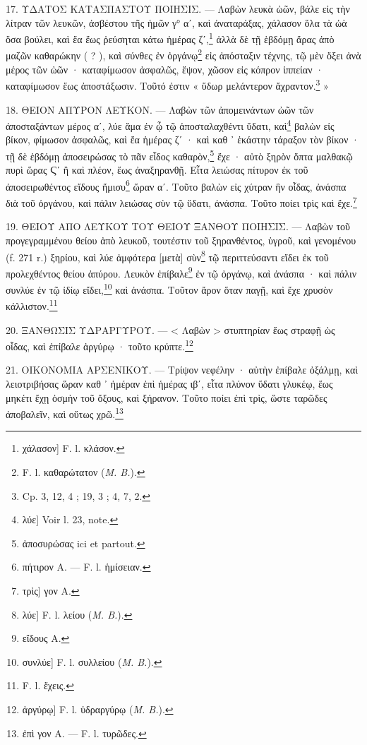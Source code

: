 \documentclass[a4paper, 11pt, oneside, polutonikogreek, french]{article}
\begin{document}
17. ΥΔΑΤΟΣ ΚΑΤΑΣΠΑΣΤΟΥ ΠΟΙΗΣΙΣ. --- Λαβὼν λευκὰ ὠῶν, βάλε εἰς τὴν λίτραν τῶν λευκῶν, ἀσβέστου τῆς ἡμῶν γ° αʹ, καὶ ἀναταράξας, χάλασον ὅλα τὰ ὠὰ ὅσα βούλει, καὶ ἔα ἕως ῥεύσηται κάτω ἡμέρας ζʹ,\footnote{χάλασον] F. l. κλάσον.} ἀλλὰ δὲ τῇ ἑβδόμῃ ἄρας ἀπὸ μαζῶν καθαρώκην ( ? ), καὶ σύνθες ἐν ὀργάνῳ\footnote{F. l. καθαρώτατον (\emph{M. B.}).} εἰς ἀπόσταξιν τέχνης, τῷ μὲν ὄξει ἀνὰ μέρος τῶν ὠῶν · καταφίμωσον ἀσφαλῶς, ἕψον, χῶσον εἰς κόπρον ἱππείαν · καταφίμωσον ἕως ἀποστάξωσιν. Τοῦτό ἐστιν « ὕδωρ μελάντερον ἄχραντον.\footnote{Cp. 3, 12, 4 ; 19, 3 ; 4, 7, 2.} »

18. ΘΕΙΟΝ ΑΠΥΡΟΝ ΛΕΥΚΟΝ. --- Λαβὼν τῶν ἀπομεινάντων ὠῶν τῶν ἀποσταξάντων μέρος αʹ, λύε ἅμα ἐν ᾧ τῷ ἀποσταλαχθέντι ὕδατι, καὶ\footnote{λύε] Voir l. 23, note.} βαλὼν εἰς βίκον, φίμωσον ἀσφαλῶς, καὶ ἔα ἡμέρας ζʹ · καὶ καθ ᾽ ἑκάστην τάραξον τὸν βίκον · τῇ δὲ ἑβδόμῃ ἀποσειρώσας τὸ πᾶν εἶδος καθαρὸν,\footnote{ἀποσυρώσας ici et partout.} ἔχε · αὐτὸ ξηρὸν ὄπτα μαλθακῷ πυρὶ ὥρας Ϛʹ ἢ καὶ πλέον, ἕως ἀναξηρανθῇ. Εἶτα λειώσας πίτυρον ἐκ τοῦ ἀποσειρωθέντος εἴδους ἥμισυ\footnote{πήτιρον A. --- F. l. ἡμίσειαν.} ὥραν αʹ. Τοῦτο βαλὼν εἰς χύτραν ἣν οἶδας, ἀνάσπα διὰ τοῦ ὀργάνου, καὶ πάλιν λειώσας σὺν τῷ ὕδατι, ἀνάσπα. Τοῦτο ποίει τρὶς καὶ ἔχε.\footnote{τρὶς] γον A.}

19. ΘΕΙΟΥ ΑΠΟ ΛΕΥΚΟΥ ΤΟΥ ΘΕΙΟΥ ΞΑΝΘΟΥ ΠΟΙΗΣΙΣ. --- Λαβὼν τοῦ προγεγραμμένου θείου ἀπὸ λευκοῦ, τουτέστιν τοῦ ξηρανθέντος, ὑγροῦ, καὶ γενομένου (f. 271 r.) ξηρίου, καὶ λύε ἀμφότερα [μετὰ] σὺν\footnote{λύε] F. l. λείου (\emph{M. B.}).} τῷ περιττεύσαντι εἴδει ἐκ τοῦ προλεχθέντος θείου ἀπύρου. Λευκὸν ἐπίβαλε\footnote{εἴδους A.} ἐν τῷ ὀργάνῳ, καὶ ἀνάσπα · καὶ πάλιν συνλύε ἐν τῷ ἰδίῳ εἴδει,\footnote{συνλύε] F. l. συλλείου (\emph{M. B.}).} καὶ ἀνάσπα. Τοῦτον ἄρον ὅταν παγῇ, καὶ ἔχε χρυσὸν κάλλιστον.\footnote{F. l. ἔχεις.}

20. ΞΑΝΘΩΣΙΣ ΥΔΡΑΡΓΥΡΟΥ. --- < Λαβὼν > στυπτηρίαν ἕως στραφῇ ὡς οἶδας, καὶ ἐπίβαλε ἀργύρῳ · τοῦτο κρύπτε.\footnote{ἀργύρῳ] F. l. ὑδραργύρῳ (\emph{M. B.}).}

21. ΟΙΚΟΝΟΜΙΑ ΑΡΣΕΝΙΚΟΥ. --- Τρίψον νεφέλην · αὐτὴν ἐπίβαλε ὀξάλμῃ, καὶ λειοτριβήσας ὥραν καθ ᾽ ἡμέραν ἐπὶ ἡμέρας ιβʹ, εἶτα πλύνον ὕδατι γλυκέῳ, ἕως μηκέτι ἔχῃ ὀσμὴν τοῦ ὄξους, καὶ ξήρανον. Τοῦτο ποίει ἐπὶ τρὶς, ὥστε ταρῶδες ἀποβαλεῖν, καὶ οὕτως χρῶ.\footnote{ἐπὶ γον A. --- F. l. τυρῶδες.}
\end{document}

